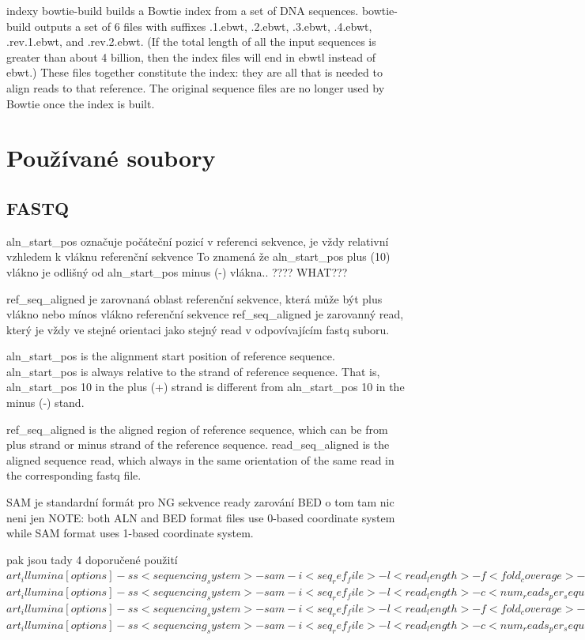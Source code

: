 \documentclass[czech,DP]{thesiskiv}
\numberwithin{equation}{section}
\begin{document}
indexy
bowtie-build builds a Bowtie index from a set of DNA sequences. bowtie-build outputs a set of 6 files with suffixes .1.ebwt, .2.ebwt, .3.ebwt, .4.ebwt, .rev.1.ebwt, and .rev.2.ebwt. (If the total length of all the input sequences is greater than about 4 billion, then the index files will end in ebwtl instead of ebwt.)
 These files together constitute the index: they are all that is needed to align reads to that reference. The original sequence files are no longer used by Bowtie once the index is built.

\section{Používané soubory}
\subsection{FASTQ}

	    
	    aln\_start\_pos označuje počáteční pozicí v referenci sekvence, je vždy relativní vzhledem k vláknu referenční sekvence
	    To znamená že aln\_start\_pos plus (10) vlákno je odlišný od  aln\_start\_pos minus (-) vlákna.. ???? WHAT???
	    
		ref\_seq\_aligned je zarovnaná oblast referenční sekvence, která může být plus vlákno nebo mínos vlákno referenční sekvence
		ref\_seq\_aligned je zarovanný read, který je vždy ve stejné orientaci jako stejný read v odpovívajícím fastq suboru.  
		
		
			    
	    
	       	
		aln\_start\_pos is the alignment start position of reference sequence. aln\_start\_pos is always relative to the strand of reference sequence. That is, aln\_start\_pos 10 in the plus (+) strand is different from aln\_start\_pos 10 in the minus (‐) stand.  
	
		ref\_seq\_aligned is the aligned region of reference sequence, which can be from plus strand or minus strand of the reference sequence. 
		read\_seq\_aligned is the aligned sequence read, which always in the same orientation of the same read in the corresponding fastq file. 

SAM je standardní formát pro NG sekvence ready zarování
BED o tom tam nic neni jen 
NOTE: both ALN and BED format files use 0-based coordinate system while SAM format uses 1-based coordinate system.

pak jsou tady 4 doporučené použití
$art_illumina [options] -ss <sequencing_system> -sam -i <seq_ref_file> -l <read_length> -f <fold_coverage> -o <outfile_prefix>$
$art_illumina [options] -ss <sequencing_system> -sam -i <seq_ref_file> -l <read_length> -c <num_reads_per_sequence> -o <outfile_prefix>$
$art_illumina [options] -ss <sequencing_system> -sam -i <seq_ref_file> -l <read_length> -f <fold_coverage> -m <mean_fragsize> -s <std_fragsize> -o <outfile_prefix>$
$art_illumina [options] -ss <sequencing_system> -sam -i <seq_ref_file> -l <read_length> -c <num_reads_per_sequence> -m <mean_fragsize> -s <std_fragsize> -o <outfile_prefix>$
\end{document}

